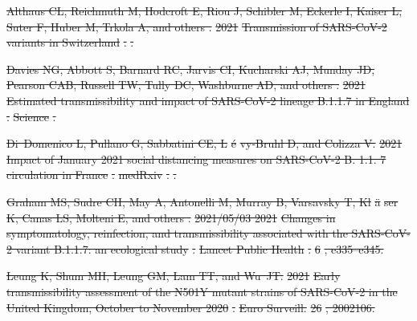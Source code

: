 \documentclass[12pt]{article}
\providecommand{\DIFdeltex}[1]{{\protect\color{red}\sout{#1}}}                      %
\providecommand{\DIFdelbegin}{} %
\providecommand{\DIFdel}[1]{\texorpdfstring{\DIFdeltex{#1}}{}} %
\newcommand{\DIFscaledelfig}{0.5}
\newlength{\DIFdelgraphicswidth} %
\newlength{\DIFdelgraphicsheight} %
\newcommand{\DIFdelincludegraphics}[2][]{%
\sbox{\DIFdelgraphicsbox}{\DIFOincludegraphics[#1]{#2}}%
\settoboxwidth{\DIFdelgraphicswidth}{\DIFdelgraphicsbox} %
\settoboxtotalheight{\DIFdelgraphicsheight}{\DIFdelgraphicsbox} %
\scalebox{\DIFscaledelfig}{%
\parbox[b]{\DIFdelgraphicswidth}{\usebox{\DIFdelgraphicsbox}\\[-\baselineskip] \rule{\DIFdelgraphicswidth}{0em}}\llap{\resizebox{\DIFdelgraphicswidth}{\DIFdelgraphicsheight}{%
\setlength{\unitlength}{\DIFdelgraphicswidth}%
\begin{picture}(1,1)%
\thicklines\linethickness{2pt} %
{\color[rgb]{1,0,0}\put(0,0){\framebox(1,1){}}}%
{\color[rgb]{1,0,0}\put(0,0){\line( 1,1){1}}}%
{\color[rgb]{1,0,0}\put(0,1){\line(1,-1){1}}}%
\end{picture}%
}\hspace*{3pt}}} %
} %
\DeclareRobustCommand{\DIFdelbegin}{\DIFOdelbegin \let\includegraphics\DIFdelincludegraphics} %
\begin{document}
\pagebreak

\DIFdelbegin %

\DIFdel{Althaus CL, Reichmuth M, Hodcroft E, Riou J, Schibler M, Eckerle I, Kaiser L,
  Suter F, Huber M, Trkola A, and others .
}%
\DIFdel{2021 }%
\DIFdel{Transmission of SARS-CoV-2 variants in Switzerland}%
\DIFdel{.
}%
\DIFdel{.
}%

\DIFdel{Davies NG, Abbott S, Barnard RC, Jarvis CI, Kucharski AJ, Munday JD, Pearson
  CAB, Russell TW, Tully DC, Washburne AD, and others .
}%
\DIFdel{2021 }%
\DIFdel{Estimated transmissibility and impact of SARS-CoV-2 lineage
  B.1.1.7 in England}%
\DIFdel{.
}%
\DIFdel{Science}%
\DIFdel{.
}%

\DIFdel{Di~Domenico L, Pullano G, Sabbatini CE, L}%
\DIFdel{\'e}%
\DIFdel{vy-Bruhl D, and Colizza V.
}%
\DIFdel{2021 }%
\DIFdel{Impact of January 2021 social distancing measures on SARS-CoV-2
  B. 1.1. 7 circulation in France}%
\DIFdel{.
}%
\DIFdel{medRxiv}%
\DIFdel{.
}%
\DIFdel{.
}%

\DIFdel{Graham MS, Sudre CH, May A, Antonelli M, Murray B, Varsavsky T, Kl}%
\DIFdel{\"a}%
\DIFdel{ser K,
  Canas LS, Molteni E, and others .
}%
\DIFdel{2021/05/03 2021 }%
\DIFdel{Changes in symptomatology, reinfection, and
  transmissibility associated with the SARS-CoV-2 variant B.1.1.7: an
  ecological study}%
\DIFdel{.
}%
\DIFdel{Lancet Public Health}%
\DIFdel{.
}%
\DIFdel{6}%
\DIFdel{, e335--e345.
}%

\DIFdel{Leung K, Shum MH, Leung GM, Lam TT, and Wu~JT.
}%
\DIFdel{2021 }%
\DIFdel{Early transmissibility assessment of the N501Y mutant strains
  of SARS-CoV-2 in the United Kingdom, October to November 2020}%
\DIFdel{.
}%
\DIFdel{Euro Surveill.}%
\DIFdel{26}%
\DIFdel{, 2002106.
}%
\end{document}
